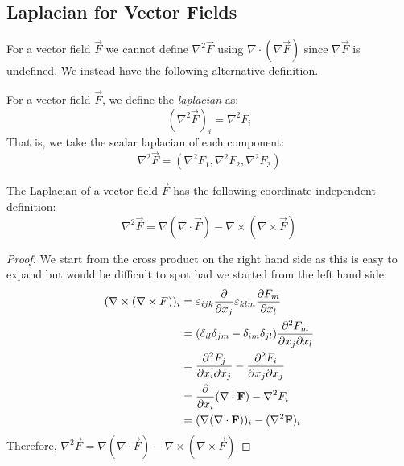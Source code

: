 \documentclass[../main.tex]{subfiles}
\begin{document}
\subsection{Laplacian for Vector Fields}
For a vector field $\vec{F}$ we cannot define $\nabla^2 \vec{F}$ using $\nabla \cdot (\nabla \vec{F})$ since $\nabla \vec{F}$ is undefined.
We instead have the following alternative definition.
\begin{definition}
  For a vector field $\vec{F}$, we define the \textit{laplacian} as:
  \[
    (\nabla^2 \vec{F})_i = \nabla^2 F_i
  \]
  That is, we take the scalar laplacian of each component:
  \[
    \nabla^2 \vec{F} = (\nabla^2 F_1, \nabla^2 F_2, \nabla^2 F_3)
  \]
\end{definition}
\begin{proposition}
  The Laplacian of a vector field $\vec{F}$ has the following coordinate independent definition:
  \[
    \nabla^2 \vec{F} = \nabla(\nabla \cdot \vec{F}) - \nabla \times (\nabla \times \vec{F})
  \]
\end{proposition}
\begin{proof}
  We start from the cross product on the right hand side as this is easy to expand but would be difficult to spot had we started from the left hand side:
  \begin{align*}
    (\nabla \times (\nabla \times F))_i &= \levi_{i j k} \pderiv{}{x_j} \levi_{k l m} \pderiv{F_m}{x_l} \\
                                        &= (\delta_{i l} \delta_{j m} - \delta_{i m}\delta_{j l})\frac{\partial^2 F_m}{\partial x_j \partial x_l}\\
                                        &= \frac{\partial^2 F_j}{\partial x_i \partial x_j} - \frac{\partial^2 F_i}{\partial x_j \partial x_j} \\
                                        &= \pderiv{}{x_i}(\nabla \cdot \vec{F}) - \nabla^2 F_i \\
                                        &= (\nabla(\nabla \cdot \vec{F}))_i  - (\nabla^2 \vec{F})_i
  \end{align*}
  Therefore, $\nabla^2 \vec{F} = \nabla(\nabla \cdot \vec{F}) - \nabla \times (\nabla \times \vec{F})$
\end{proof}
\end{document}
